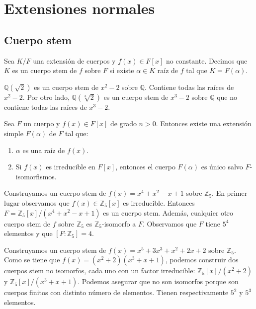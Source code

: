 \chapter{Extensiones normales}
\section{Cuerpo stem}

\begin{definition}
    Sea $K/F$ una extensión de cuerpos y $f(x) \in F[x]$ no constante.
    Decimos que $K$ es un cuerpo stem de $f$ sobre $F$ si existe $\alpha \in K$ raíz de $f$ tal que $K = F(\alpha)$.
\end{definition}

\begin{example}
    $\mathbb{Q}(\sqrt{2})$ es un cuerpo stem de $x^2 - 2$ sobre $\mathbb{Q}$.
    Contiene todas las raíces de $x^2 - 2$.
    Por otro lado, $\mathbb{Q}(\sqrt[3]{2})$ es un cuerpo stem de $x^3 - 2$ sobre $\mathbb{Q}$ que no contiene todas las raíces de $x^3 - 2$.
\end{example}

\begin{theorem}
    Sea $F$ un cuerpo y $f(x) \in F[x]$ de grado $n > 0$. Entonces existe una extensión simple $F(\alpha)$ de $F$ tal que:
    \begin{enumerate}
        \item $\alpha$ es una raíz de $f(x)$.
        \item Si $f(x)$ es irreducible en $F[x]$, entonces el cuerpo $F(\alpha)$ es único salvo $F$-isomorfismos.
    \end{enumerate}
\end{theorem}

\begin{example}
    Construyamos un cuerpo stem de $f(x) = x^4 + x^2 - x + 1$ sobre $\mathbb{Z}_5$.
    En primer lugar observamos que $f(x) \in \mathbb{Z}_5[x]$ es irreducible.
    Entonces $F = \mathbb{Z}_5[x]/(x^4 + x^2 - x + 1)$ es un cuerpo stem.
    Además, cualquier otro cuerpo stem de $f$ sobre $\mathbb{Z}_5$ es $\mathbb{Z}_5$-isomorfo a $F$.
    Observamos que $F$ tiene $5^4$ elementos y que $[F : \mathbb{Z}_5] = 4$.
\end{example}

\begin{example}
    Construyamos un cuerpo stem de $f(x) = x^5 + 3x^3 + x^2 + 2x +2$ sobre $\mathbb{Z}_5$.
    Como se tiene que $f(x) = (x^2 + 2)(x^3 + x + 1)$, podemos construir dos cuerpos stem no isomorfos, cada uno con un factor irreducible: $\mathbb{Z}_5[x]/(x^2+2)$ y $\mathbb{Z}_5[x]/(x^3+x+1)$.
    Podemos asegurar que no son isomorfos porque son cuerpos finitos con distinto número de elementos.
    Tienen respectivamente $5^2$ y $5^3$ elementos.
\end{example}

